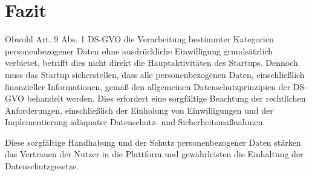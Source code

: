 \section{Fazit}

Obwohl Art. 9 Abs. 1 DS-GVO die Verarbeitung bestimmter Kategorien personenbezogener Daten ohne ausdrückliche Einwilligung grundsätzlich verbietet, betrifft dies nicht direkt die Hauptaktivitäten des Startups. Dennoch muss das Startup sicherstellen, dass alle personenbezogenen Daten, einschließlich finanzieller Informationen, gemäß den allgemeinen Datenschutzprinzipien der DS-GVO behandelt werden. Dies erfordert eine sorgfältige Beachtung der rechtlichen Anforderungen, einschließlich der Einholung von Einwilligungen und der Implementierung adäquater Datenschutz- und Sicherheitsmaßnahmen.

Diese sorgfältige Handhabung und der Schutz personenbezogener Daten stärken das Vertrauen der Nutzer in die Plattform und gewährleisten die Einhaltung der Datenschutzgesetze.

